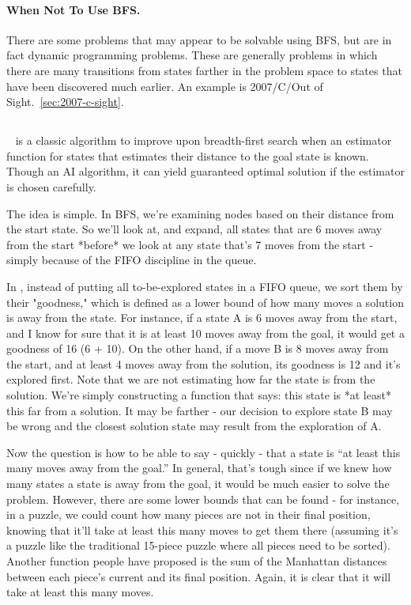 \paragraph{When Not To Use BFS.}

There are some problems that may appear to be solvable using BFS, but are in fact 
dynamic programming problems.  These are generally problems in which there are
many transitions from states farther in the problem space to states that have
been discovered much earlier.
An example is 2007/C/Out of Sight.~\ref{sec:2007-c-sight}.

\subsection{\astar}
\label{sec:astar}

\astar~\cite{Pearl:1984} is a classic algorithm to improve upon breadth-first search when an
estimator function for states that estimates their distance to the goal state is known.
Though an AI algorithm, it can yield guaranteed optimal solution if the estimator is chosen
carefully.

The idea is simple.  In BFS, we're examining nodes based on their distance from the start state. 
So we'll look at, and expand, all states that are 6 moves away from the start *before* we 
look at any state that's 7 moves from the start - simply because of the FIFO discipline in the queue.

In \astar, instead of putting all to-be-explored states in a FIFO queue,
we sort them by their "goodness," which is defined as a
lower bound of how many moves a solution is away from the state.
For instance, if a state A is 6 moves away from the start, and
I know for sure that it is at least 10 moves away from the goal,
it would get a goodness of 16 (6 + 10).  On the other hand, if a
move B is 8 moves away from the start, and at least 4 moves away
from the solution, its goodness is 12 and it's explored first.
Note that we are not estimating how far the state is from
the solution. We're simply constructing a function that says: this
state is *at least* this far from a solution. It may be farther -
our decision to explore state B may be wrong and the closest solution
state may result from the exploration of A.

Now the question is how to be able to say - quickly - that a state is
``at least this many moves away from the goal.''  In general, that's
tough since if we knew how many states a state is away from the goal,
it would be much easier to solve the problem. However, there are some lower
bounds that can be found - for instance, in a puzzle, we could count how
many pieces are not in their final position, knowing that it'll take at
least this many moves to get them there (assuming it's a puzzle like
the traditional 15-piece puzzle where all pieces need to be sorted).
Another function people have proposed is the sum of the Manhattan
distances between each piece's current and its final position.  
Again, it is clear that it will take at least this many moves.

